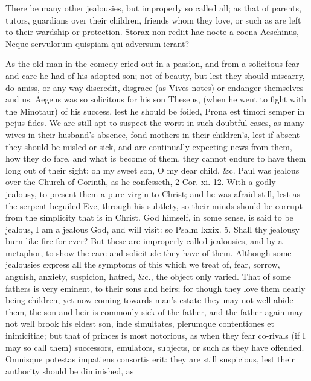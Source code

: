 {There be many other jealousies, but improperly so called all; as that
of parents, tutors, guardians over their children, friends whom they
love, or such as are left to their wardship or protection.
Storax non rediit hac nocte a coena Aeschinus,
Neque servulorum quispiam qui adversum ierant?

As the old man in the comedy cried out in a passion, and from a
solicitous fear and care he had of his adopted son; not of
beauty, but lest they should miscarry, do amiss, or any way discredit,
disgrace (as Vives notes) or endanger themselves and us. Aegeus
was so solicitous for his son Theseus, (when he went to fight with the
Minotaur) of his success, lest he should be foiled, Prona est
timori semper in pejus fides. We are still apt to suspect the worst in
such doubtful cases, as many wives in their husband's absence, fond
mothers in their children's, lest if absent they should be misled or
sick, and are continually expecting news from them, how they do fare,
and what is become of them, they cannot endure to have them long out of
their sight: oh my sweet son, O my dear child, \&c. Paul was jealous
over the Church of Corinth, as he confesseth, 2 Cor. xi. 12. With a
godly jealousy, to present them a pure virgin to Christ; and he was
afraid still, lest as the serpent beguiled Eve, through his subtlety,
so their minds should be corrupt from the simplicity that is in Christ.
God himself, in some sense, is said to be jealous, I am a jealous
God, and will visit: so Psalm lxxix. 5. Shall thy jealousy burn like
fire for ever? But these are improperly called jealousies, and by a
metaphor, to show the care and solicitude they have of them. Although
some jealousies express all the symptoms of this which we treat of,
fear, sorrow, anguish, anxiety, suspicion, hatred, \&c., the object only
varied. That of some fathers is very eminent, to their sons and heirs;
for though they love them dearly being children, yet now coming towards
man's estate they may not well abide them, the son and heir is commonly
sick of the father, and the father again may not well brook his eldest
son, inde simultates, plerumque contentiones et inimicitiae; but that
of princes is most notorious, as when they fear co-rivals (if I may so
call them) successors, emulators, subjects, or such as they have
offended.  Omnisque potestas impatiens consortis erit: they are
still suspicious, lest their authority should be diminished, as
}
